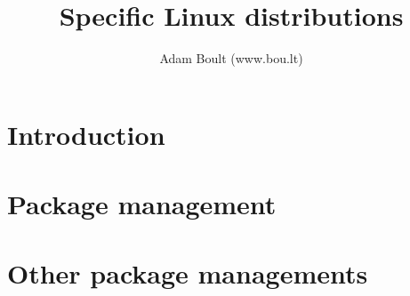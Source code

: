 \documentclass[oneside]{book}
\begin{document}
\author{Adam Boult (www.bou.lt)}
\title{Specific Linux distributions}
\maketitle

\setcounter{tocdepth}{0}
\tableofcontents



\part{Introduction}


\part{Package management}












\part{Other package managements}


\end{document}
